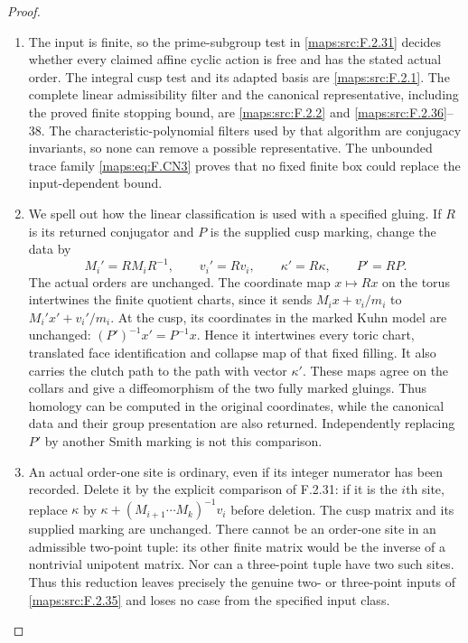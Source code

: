 \documentclass[11pt,a4paper]{article}
\theoremstyle{definition}
\begin{document}
\begin{proof}
\begin{enumerate}[label=\arabic*.]
\item The input is finite, so the prime-subgroup test in \ref{maps:src:F.2.31}
decides whether every claimed affine cyclic action is free
and has the stated actual order.  The integral cusp test and
its adapted basis are \ref{maps:src:F.2.1}.  The complete linear admissibility
filter and the canonical representative, including the proved
finite stopping bound, are \ref{maps:src:F.2.2} and \ref{maps:src:F.2.36}--38.  The
characteristic-polynomial filters used by that algorithm are
conjugacy invariants, so none can remove a possible
representative.  The unbounded trace family \eqref{maps:eq:F.CN3} proves
that no fixed finite box could replace the input-dependent
bound.

\item We spell out how the linear classification is used with a
specified gluing.  If $R$ is its returned conjugator and
$P$ is the supplied cusp marking, change the data by
\[
 M_i'=RM_iR^{-1},\qquad v_i'=Rv_i,\qquad
 \kappa'=R\kappa,\qquad P'=RP.                           \tag{F.SY1}\label{maps:eq:F.SY1}
\]
The actual orders are unchanged.  The coordinate map
$x\mapsto Rx$ on the torus intertwines the finite quotient
charts, since it sends $M_ix+v_i/m_i$ to
$M_i'x'+v_i'/m_i$.  At the cusp, its coordinates in the
marked Kuhn model are unchanged:
$(P')^{-1}x'=P^{-1}x$.  Hence it intertwines every toric
chart, translated face identification and collapse map of
that fixed filling.  It also carries the clutch path to
the path with vector $\kappa'$.  These maps agree on the
collars and give a diffeomorphism of the two fully marked
gluings.  Thus homology can be computed in the original
coordinates, while the canonical data and their group
presentation are also returned.  Independently replacing
$P'$ by another Smith marking is not this comparison.

\item An actual order-one site is ordinary, even if its integer
numerator has been recorded.  Delete it by the explicit
comparison of F.2.31: if it is the $i$th site, replace
$\kappa$ by
$\kappa+(M_{i+1}\cdots M_k)^{-1}v_i$ before deletion.
The cusp matrix and its supplied marking are unchanged.
There cannot be an order-one site in an admissible two-point
tuple: its other finite matrix would be the inverse of a
nontrivial unipotent matrix.  Nor can a three-point tuple
have two such sites.  Thus this reduction leaves precisely
the genuine two- or three-point inputs of \ref{maps:src:F.2.35} and loses
no case from the specified input class.


\end{enumerate}
\end{proof}
\end{document}
